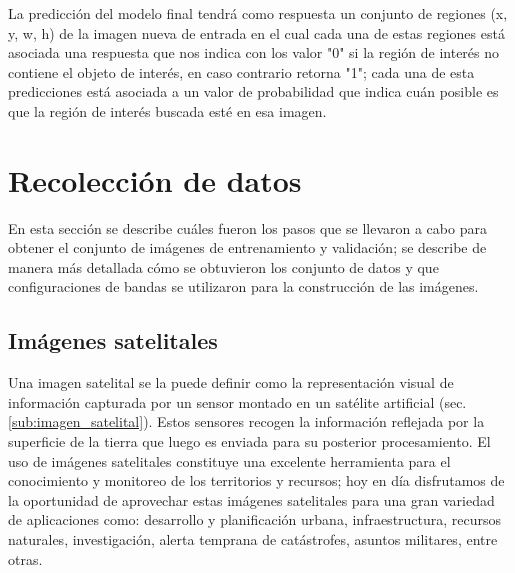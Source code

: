 La predicción del modelo final tendrá como respuesta un conjunto de regiones (x, y, w, h) de la imagen nueva de entrada en el cual cada una de estas regiones está asociada una respuesta que nos indica con los valor "0" si la región de interés no contiene el objeto de interés, en caso contrario  retorna "1"; cada una de esta predicciones está asociada a un valor de probabilidad que indica cuán posible es que la región de interés buscada esté en esa imagen.

\section{Recolección de datos}\label{sec:recoleccion}

En esta sección se describe cuáles fueron los pasos que se llevaron a cabo para obtener el conjunto de imágenes de entrenamiento y validación; se describe de manera más detallada cómo se obtuvieron los conjunto de datos y que configuraciones de bandas se utilizaron para la construcción de las imágenes.


\subsection{Imágenes satelitales}\label{sub:nivelesdeprocesamiento}

Una imagen satelital se la puede definir como la representación visual de información capturada por un sensor montado en un satélite artificial (sec. \ref{sub:imagen_satelital}). Estos sensores recogen la información reflejada por la superficie de la tierra que luego es enviada para su posterior procesamiento. El uso de imágenes satelitales constituye una excelente herramienta para el conocimiento y monitoreo de los territorios y recursos; hoy en día disfrutamos de la oportunidad de aprovechar estas imágenes satelitales para una gran variedad de aplicaciones como: desarrollo y planificación urbana, infraestructura, recursos naturales, investigación, alerta temprana de catástrofes, asuntos militares, entre otras.

